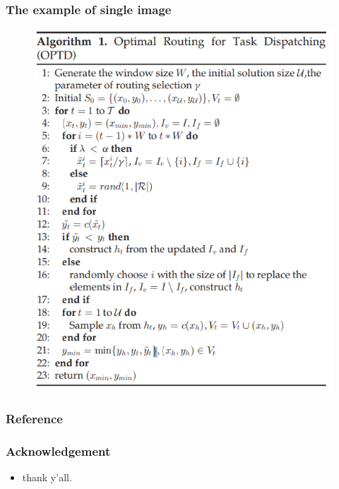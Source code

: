 \documentclass{beamer}%
\begin{document}
\begin{frame}
	\frametitle{The example of single image}
	
	
	\begin{figure}[htpb]
		\centering
		{
			\includegraphics[scale=0.3]{algorithm1.png}
		}
		\label{fig:algorithm1}
	\end{figure}
	
	
\end{frame}


\begin{frame}
	\frametitle{Reference}
	\printbibliography
\end{frame}


\begin{frame}
	\frametitle{Acknowledgement}
	\begin{itemize}

		\item<1->thank y'all.
		      
	\end{itemize}
\end{frame}
\end{document}
